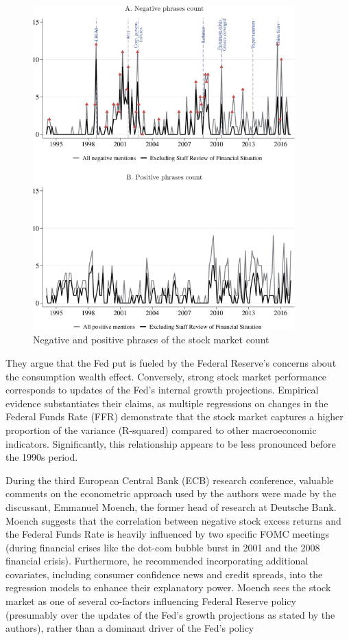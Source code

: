 \begin{figure}[h]
    \centering
    \includegraphics[width=0.9\textwidth]{figures/cies21/Figure5}
    \caption{Negative and positive phrases of the stock market count \parencite{cieslak_economics_2021}}
\end{figure}

They argue that the Fed put is fueled by the Federal Reserve's concerns about the consumption wealth effect. Conversely, strong stock market performance corresponds to updates of the Fed’s internal growth projections. Empirical evidence substantiates their claims, as multiple regressions on changes in the Federal Funds Rate (FFR) demonstrate that the stock market captures a higher proportion of the variance (R-squared) compared to other macroeconomic indicators. Significantly, this relationship appears to be less pronounced before the 1990s period.  \parencite{cieslak_economics_2021}

During the third European Central Bank (ECB) research conference, valuable comments on the econometric approach used by the authors were made by the discussant, Emmanuel Moench, the former head of research at Deutsche Bank. Moench suggests that the correlation between negative stock excess returns and the Federal Funds Rate is heavily influenced by two specific FOMC meetings (during financial crises like the dot-com bubble burst in 2001 and the 2008 financial crisis). Furthermore, he recommended incorporating additional covariates, including consumer confidence news and credit spreads, into the regression models to enhance their explanatory power. Moench sees the stock market as one of several co-factors influencing Federal Reserve policy (presumably over the updates of the Fed's growth projections as stated by the authors), rather than a dominant driver of the Fed's policy \parencite{european_central_bank_third_2018}

